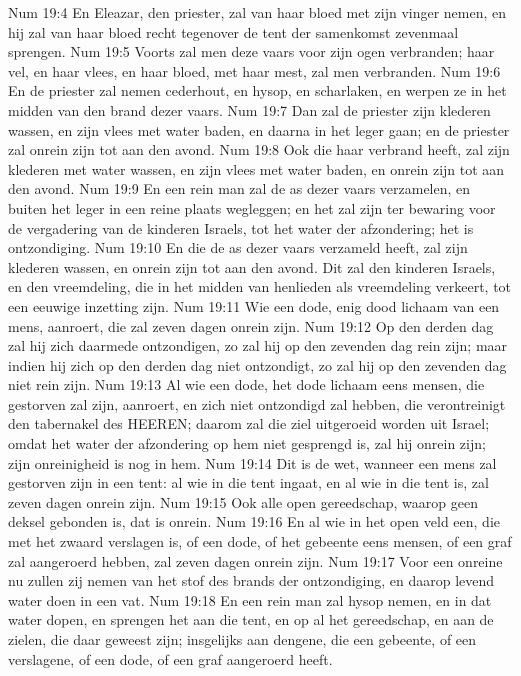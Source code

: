 Num 19:4  En Eleazar, den priester, zal van haar bloed met zijn vinger nemen, en hij zal van haar bloed recht tegenover de tent der samenkomst zevenmaal sprengen.
Num 19:5  Voorts zal men deze vaars voor zijn ogen verbranden; haar vel, en haar vlees, en haar bloed, met haar mest, zal men verbranden.
Num 19:6  En de priester zal nemen cederhout, en hysop, en scharlaken, en werpen ze in het midden van den brand dezer vaars.
Num 19:7  Dan zal de priester zijn klederen wassen, en zijn vlees met water baden, en daarna in het leger gaan; en de priester zal onrein zijn tot aan den avond.
Num 19:8  Ook die haar verbrand heeft, zal zijn klederen met water wassen, en zijn vlees met water baden, en onrein zijn tot aan den avond.
Num 19:9  En een rein man zal de as dezer vaars verzamelen, en buiten het leger in een reine plaats wegleggen; en het zal zijn ter bewaring voor de vergadering van de kinderen Israels, tot het water der afzondering; het is ontzondiging.
Num 19:10  En die de as dezer vaars verzameld heeft, zal zijn klederen wassen, en onrein zijn tot aan den avond. Dit zal den kinderen Israels, en den vreemdeling, die in het midden van henlieden als vreemdeling verkeert, tot een eeuwige inzetting zijn.
Num 19:11  Wie een dode, enig dood lichaam van een mens, aanroert, die zal zeven dagen onrein zijn.
Num 19:12  Op den derden dag zal hij zich daarmede ontzondigen, zo zal hij op den zevenden dag rein zijn; maar indien hij zich op den derden dag niet ontzondigt, zo zal hij op den zevenden dag niet rein zijn.
Num 19:13  Al wie een dode, het dode lichaam eens mensen, die gestorven zal zijn, aanroert, en zich niet ontzondigd zal hebben, die verontreinigt den tabernakel des HEEREN; daarom zal die ziel uitgeroeid worden uit Israel; omdat het water der afzondering op hem niet gesprengd is, zal hij onrein zijn; zijn onreinigheid is nog in hem.
Num 19:14  Dit is de wet, wanneer een mens zal gestorven zijn in een tent: al wie in die tent ingaat, en al wie in die tent is, zal zeven dagen onrein zijn.
Num 19:15  Ook alle open gereedschap, waarop geen deksel gebonden is, dat is onrein.
Num 19:16  En al wie in het open veld een, die met het zwaard verslagen is, of een dode, of het gebeente eens mensen, of een graf zal aangeroerd hebben, zal zeven dagen onrein zijn.
Num 19:17  Voor een onreine nu zullen zij nemen van het stof des brands der ontzondiging, en daarop levend water doen in een vat.
Num 19:18  En een rein man zal hysop nemen, en in dat water dopen, en sprengen het aan die tent, en op al het gereedschap, en aan de zielen, die daar geweest zijn; insgelijks aan dengene, die een gebeente, of een verslagene, of een dode, of een graf aangeroerd heeft.
